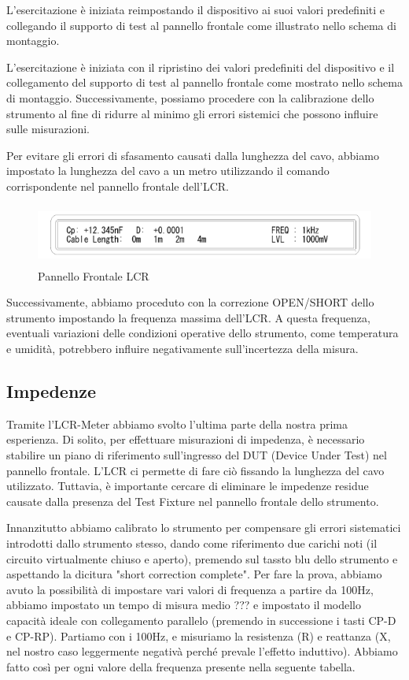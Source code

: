 L'esercitazione è iniziata reimpostando il dispositivo ai suoi valori predefiniti e collegando il supporto di test al pannello frontale come illustrato nello schema di montaggio.

L'esercitazione è iniziata con il ripristino dei valori predefiniti del dispositivo e il collegamento del supporto di test al pannello frontale come mostrato nello schema di montaggio. Successivamente, possiamo procedere con la calibrazione dello strumento al fine di ridurre al minimo gli errori sistemici che possono influire sulle misurazioni.

Per evitare gli errori di sfasamento causati dalla lunghezza del cavo, abbiamo impostato la lunghezza del cavo a un metro utilizzando il comando corrispondente nel pannello frontale dell'LCR.

\begin{figure}[ht]
    \centering
    \includegraphics[height=2cm]{media/pannello_frontale_LCR.png}
    \caption{Pannello Frontale LCR}
    \label{fig:pannello_frontale_LCR}
\end{figure}
\FloatBarrier

Successivamente, abbiamo proceduto con la correzione OPEN/SHORT dello strumento impostando la frequenza massima dell'LCR. A questa frequenza, eventuali variazioni delle condizioni operative dello strumento, come temperatura e umidità, potrebbero influire negativamente sull'incertezza della misura.




\subsection{Impedenze}
\label{sub:z}

Tramite l'LCR-Meter abbiamo svolto l'ultima parte della nostra prima esperienza.
Di solito, per effettuare misurazioni di impedenza, è necessario stabilire un piano di riferimento sull'ingresso del DUT (Device Under Test) nel pannello frontale. L'LCR ci permette di fare ciò fissando la lunghezza del cavo utilizzato. Tuttavia, è importante cercare di eliminare le impedenze residue causate dalla presenza del Test Fixture nel pannello frontale dello strumento.


Innanzitutto abbiamo calibrato lo strumento per compensare gli errori sistematici introdotti dallo strumento stesso, dando come riferimento due carichi noti (il circuito virtualmente chiuso e aperto), premendo sul tassto blu dello strumento e aspettando la dicitura "short correction complete".
Per fare la prova, abbiamo avuto la possibilità di impostare vari valori di frequenza a partire da 100Hz, abbiamo impostato un tempo di misura medio ??? e impostato il modello capacità ideale con collegamento parallelo (premendo in successione i tasti CP-D e CP-RP).
Partiamo con i 100Hz, e misuriamo la resistenza (R) e reattanza (X, nel nostro caso leggermente negativà perché prevale l'effetto induttivo). Abbiamo fatto così per ogni valore della frequenza presente nella seguente tabella.  


